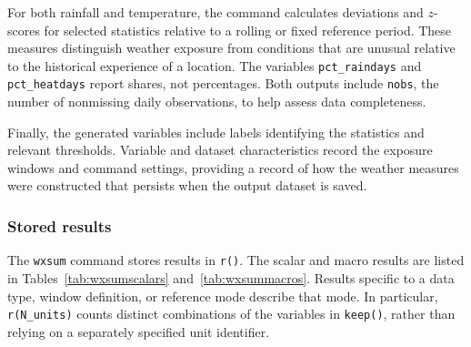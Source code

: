 For both rainfall and temperature, the command calculates deviations and $z$-scores for selected statistics relative to a rolling or fixed reference period. These measures distinguish weather exposure from conditions that are unusual relative to the historical experience of a location. The variables \texttt{pct\_raindays} and \texttt{pct\_heatdays} report shares, not percentages. Both outputs include \texttt{nobs}, the number of nonmissing daily observations, to help assess data completeness.

Finally, the generated variables include labels identifying the statistics and relevant thresholds. Variable and dataset characteristics record the exposure windows and command settings, providing a record of how the weather measures were constructed that persists when the output dataset is saved.

\subsubsection{Stored results}

The \texttt{wxsum} command stores results in \texttt{r()}. The scalar and macro results are listed in Tables~\ref{tab:wxsumscalars} and~\ref{tab:wxsummacros}. Results specific to a data type, window definition, or reference mode describe that mode. In particular, \texttt{r(N\_units)} counts distinct combinations of the variables in \texttt{keep()}, rather than relying on a separately specified unit identifier.

